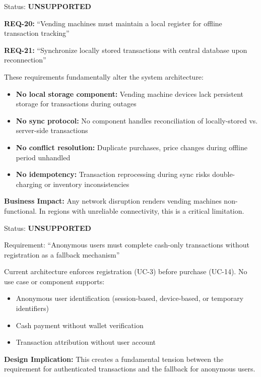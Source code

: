 \documentclass[11pt,a4paper]{article}
\begin{document}
\begin{tcolorbox}[colback=criticalred!5,colframe=criticalred,title=\textbf{REQ-20, REQ-21: Offline Operation}]
Status: \textbf{UNSUPPORTED}

\textbf{REQ-20:} ``Vending machines must maintain a local register for offline transaction tracking''

\textbf{REQ-21:} ``Synchronize locally stored transactions with central database upon reconnection''

These requirements fundamentally alter the system architecture:
\begin{itemize}
    \item \textbf{No local storage component:} Vending machine devices lack persistent storage for transactions during outages
    \item \textbf{No sync protocol:} No component handles reconciliation of locally-stored vs. server-side transactions
    \item \textbf{No conflict resolution:} Duplicate purchases, price changes during offline period unhandled
    \item \textbf{No idempotency:} Transaction reprocessing during sync risks double-charging or inventory inconsistencies
\end{itemize}

\textbf{Business Impact:} Any network disruption renders vending machines non-functional. In regions with unreliable connectivity, this is a critical limitation.
\end{tcolorbox}

\begin{tcolorbox}[colback=criticalred!5,colframe=criticalred,title=\textbf{REQ-22: Anonymous Cash Transactions}]
Status: \textbf{UNSUPPORTED}

Requirement: ``Anonymous users must complete cash-only transactions without registration as a fallback mechanism''

Current architecture enforces registration (UC-3) before purchase (UC-14). No use case or component supports:
\begin{itemize}
    \item Anonymous user identification (session-based, device-based, or temporary identifiers)
    \item Cash payment without wallet verification
    \item Transaction attribution without user account
\end{itemize}

\textbf{Design Implication:} This creates a fundamental tension between the requirement for authenticated transactions and the fallback for anonymous users.
\end{tcolorbox}
\end{document}
